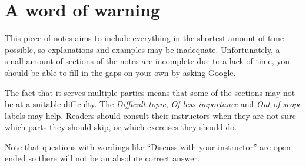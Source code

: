 \section*{A word of warning}

This piece of notes aims to include everything in the shortest amount of time possible, so explanations and examples may be inadequate. Unfortunately, a small amount of sections of the notes are incomplete due to a lack of time, you should be able to fill in the gaps on your own by asking Google.

The fact that it serves multiple parties means that some of the sections may not be at a suitable difficulty. The \textit{Difficult topic}, \textit{Of less importance} and \textit{Out of scope} labels may help. Readers should consult their instructors when they are not sure which parts they should skip, or which exercises they should do.

Note that questions with wordings like ``Discuss with your instructor'' are open ended so there will not be an absolute correct answer.

